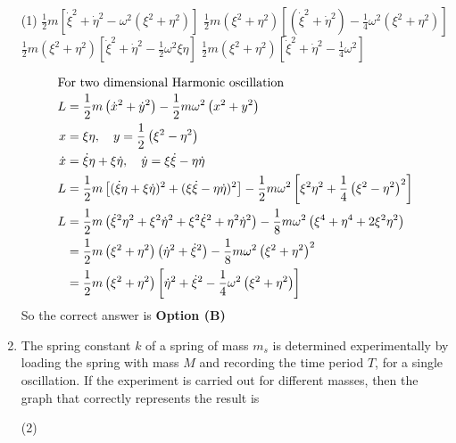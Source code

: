 \begin{enumerate}
	\begin{tasks}(1)
		\task[\textbf{A.}] $\frac{1}{2} m\left[\dot{\xi}^{2}+\dot{\eta}^{2}-\omega^{2}\left(\xi^{2}+\eta^{2}\right)\right]$
		\task[\textbf{B.}] $\frac{1}{2} m\left(\xi^{2}+\eta^{2}\right)\left[\left(\dot{\xi}^{2}+\dot{\eta}^{2}\right)-\frac{1}{4} \omega^{2}\left(\xi^{2}+\eta^{2}\right)\right]$
		\task[\textbf{C.}] $\frac{1}{2} m\left(\xi^{2}+\eta^{2}\right)\left[\dot{\xi}^{2}+\dot{\eta}^{2}-\frac{1}{2} \omega^{2} \xi \eta\right]$
		\task[\textbf{D.}] $\frac{1}{2} m\left(\xi^{2}+\eta^{2}\right)\left[\dot{\xi}^{2}+\dot{\eta}^{2}-\frac{1}{4} \omega^{2}\right]$
	\end{tasks}	
\begin{answer}
	\begin{align*}
	\intertext{For two dimensional Harmonic oscillation}
	L&=\frac{1}{2} m\left(\dot{x}^{2}+\dot{y}^{2}\right)-\frac{1}{2} m \omega^{2}\left(x^{2}+y^{2}\right)\\
	x&=\xi \eta, \quad y=\frac{1}{2}\left(\xi^{2}-\eta^{2}\right)\\
	\dot{x}&=\dot{\xi} \eta+\xi \dot{\eta}, \quad \dot{y}=\xi \dot{\xi}-\eta \dot{\eta}\\
	L&=\frac{1}{2} m\left[(\dot{\xi} \eta+\xi \dot{\eta})^{2}+(\xi \dot{\xi}-\eta \dot{\eta})^{2}\right]-\frac{1}{2} m \omega^{2}\left[\xi^{2} \eta^{2}+\frac{1}{4}\left(\xi^{2}-\eta^{2}\right)^{2}\right]\\
	L&=\frac{1}{2} m\left(\dot{\xi}^{2} \eta^{2}+\xi^{2} \dot{\eta}^{2}+\xi^{2} \dot{\xi}^{2}+\eta^{2} \dot{\eta}^{2}\right)-\frac{1}{8} m \omega^{2}\left(\xi^{4}+\eta^{4}+2 \xi^{2} \eta^{2}\right)\\
	&=\frac{1}{2} m\left(\xi^{2}+\eta^{2}\right)\left(\dot{\eta}^{2}+\dot{\xi}^{2}\right)-\frac{1}{8} m \omega^{2}\left(\xi^{2}+\eta^{2}\right)^{2}\\
	&=\frac{1}{2} m\left(\xi^{2}+\eta^{2}\right)\left[\dot{\eta}^{2}+\dot{\xi}^{2}-\frac{1}{4} \omega^{2}\left(\xi^{2}+\eta^{2}\right)\right]
	\end{align*}
	So the correct answer is \textbf{Option (B)}
\end{answer}
	\item The spring constant $k$ of a spring of mass $m_{s}$ is determined experimentally by loading the spring with mass $M$ and recording the time period $T$, for a single oscillation. If the experiment is carried out for different masses, then the graph that correctly represents the result is
	{}
	\begin{tasks}(2)
		\task[\textbf{A.}] \begin{figure}[H]

\end{figure}
\end{tasks}
\end{enumerate}
